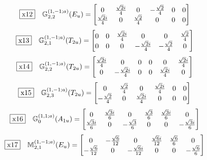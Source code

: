 \documentclass[fleqn,10pt,landscape]{jsarticle}
\begin{document}
\begin{dmath*}
\fbox{x12}\quad \mathbb{G}_{2,2}^{(1,-1;a)}(E_{u})=\begin{bmatrix} 0 & \frac{\sqrt{2} i}{4} & 0 & - \frac{\sqrt{2}}{4} & 0 & 0 \\ \frac{\sqrt{2} i}{4} & 0 & \frac{\sqrt{2}}{4} & 0 & 0 & 0 \end{bmatrix}
\end{dmath*}
\begin{dmath*}
\fbox{x13}\quad \mathbb{G}_{2,1}^{(1,-1;a)}(T_{2u})=\begin{bmatrix} 0 & 0 & \frac{\sqrt{2} i}{4} & 0 & 0 & \frac{\sqrt{2}}{4} \\ 0 & 0 & 0 & - \frac{\sqrt{2} i}{4} & - \frac{\sqrt{2}}{4} & 0 \end{bmatrix}
\end{dmath*}
\begin{dmath*}
\fbox{x14}\quad \mathbb{G}_{2,2}^{(1,-1;a)}(T_{2u})=\begin{bmatrix} \frac{\sqrt{2} i}{4} & 0 & 0 & 0 & 0 & \frac{\sqrt{2} i}{4} \\ 0 & - \frac{\sqrt{2} i}{4} & 0 & 0 & \frac{\sqrt{2} i}{4} & 0 \end{bmatrix}
\end{dmath*}
\begin{dmath*}
\fbox{x15}\quad \mathbb{G}_{2,3}^{(1,-1;a)}(T_{2u})=\begin{bmatrix} 0 & \frac{\sqrt{2}}{4} & 0 & \frac{\sqrt{2} i}{4} & 0 & 0 \\ - \frac{\sqrt{2}}{4} & 0 & \frac{\sqrt{2} i}{4} & 0 & 0 & 0 \end{bmatrix}
\end{dmath*}
\begin{dmath*}
\fbox{x16}\quad \mathbb{G}_{0}^{(1,1;a)}(A_{1u})=\begin{bmatrix} 0 & \frac{\sqrt{3} i}{6} & 0 & \frac{\sqrt{3}}{6} & \frac{\sqrt{3} i}{6} & 0 \\ \frac{\sqrt{3} i}{6} & 0 & - \frac{\sqrt{3}}{6} & 0 & 0 & - \frac{\sqrt{3} i}{6} \end{bmatrix}
\end{dmath*}
\begin{dmath*}
\fbox{x17}\quad \mathbb{M}_{2,1}^{(1,-1;a)}(E_{u})=\begin{bmatrix} 0 & - \frac{\sqrt{6}}{12} & 0 & \frac{\sqrt{6} i}{12} & \frac{\sqrt{6}}{6} & 0 \\ - \frac{\sqrt{6}}{12} & 0 & - \frac{\sqrt{6} i}{12} & 0 & 0 & - \frac{\sqrt{6}}{6} \end{bmatrix}
\end{dmath*}
\end{document}
